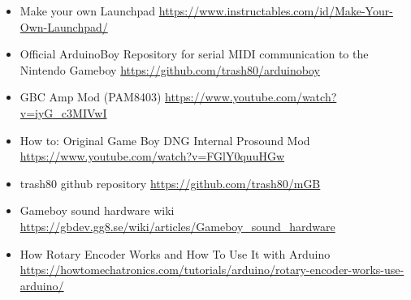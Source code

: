 \documentclass{article}
\begin{document}
\begin{itemize}

        \item Make your own Launchpad
                \url{https://www.instructables.com/id/Make-Your-Own-Launchpad/}

        \item Official ArduinoBoy Repository for serial MIDI communication to the Nintendo Gameboy 
                \url{https://github.com/trash80/arduinoboy}

        \item GBC Amp Mod (PAM8403)
                \url{https://www.youtube.com/watch?v=iyG_c3MIVwI}
        
        \item How to: Original Game Boy DNG Internal Prosound Mod
                \url{https://www.youtube.com/watch?v=FGlY0quuHGw}

        \item trash80 github repository 
                \url{https://github.com/trash80/mGB }
            
        \item Gameboy sound hardware wiki
                \url{https://gbdev.gg8.se/wiki/articles/Gameboy_sound_hardware}

        \item How Rotary Encoder Works and How To Use It with Arduino
                \url{https://howtomechatronics.com/tutorials/arduino/rotary-encoder-works-use-arduino/}
    
\end{itemize}
\end{document}

